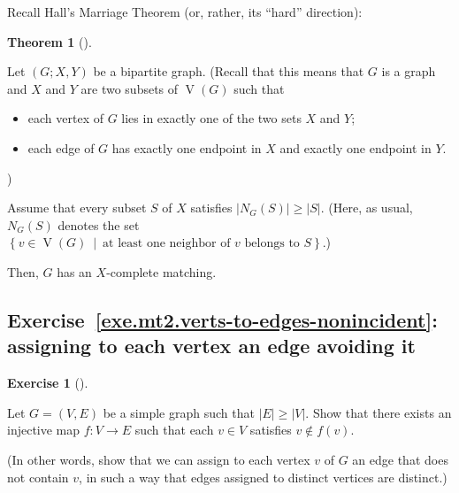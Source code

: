\documentclass[numbers=enddot,12pt,final,onecolumn,notitlepage]{scrartcl}%
\newcounter{exer}
\theoremstyle{definition}
\newtheorem{theo}{Theorem}[section]
\newenvironment{theorem}[1][]
{\begin{theo}[#1]\begin{leftbar}}
{\end{leftbar}\end{theo}}
\newtheorem{exmp}[exer]{Exercise}
\newenvironment{exercise}[1][]
{\begin{exmp}[#1]\begin{leftbar}}
{\end{leftbar}\end{exmp}}
\newcommand{\set}[1]{\left\{ #1 \right\}}
\newcommand{\abs}[1]{\left| #1 \right|}
\newcommand{\tup}[1]{\left( #1 \right)}
\newcommand{\verts}[1]{\operatorname{V}\left( #1 \right)}
\begin{document}
Recall Hall's Marriage Theorem (or, rather, its ``hard'' direction):

\begin{theorem} \label{thm.hall.hard-direction}
Let $\tup{G; X, Y}$ be a bipartite graph.
(Recall that this means that $G$ is a graph and $X$ and $Y$ are two
subsets of $\verts{G}$ such that
\begin{itemize}
\item each vertex of $G$ lies in exactly
one of the two sets $X$ and $Y$;
\item each edge of $G$ has
exactly one endpoint in $X$ and exactly one endpoint in $Y$.
\end{itemize}
)

Assume that every subset $S$ of $X$ satisfies
$\abs{N_G\tup{S}} \geq \abs{S}$.
(Here, as usual, $N_G\tup{S}$ denotes the set
$\set{ v \in \verts{G} \ \mid \ \text{at least one neighbor of } v
                        \text{ belongs to } S }$.)

Then, $G$ has an $X$-complete matching.
\end{theorem}

\subsection{Exercise~\ref{exe.mt2.verts-to-edges-nonincident}:
assigning to each vertex an edge avoiding it}

\begin{exercise} \label{exe.mt2.verts-to-edges-nonincident}
Let $G = \tup{V, E}$ be a simple graph such that
$\abs{E} \geq \abs{V}$.
Show that there exists an injective map $f : V \to E$ such that each
$v \in V$ satisfies $v \notin f\tup{v}$.

(In other words, show that we can assign to each vertex $v$ of $G$
an edge that does not contain $v$, in such a way that edges assigned
to distinct vertices are distinct.)
\end{exercise}
\end{document}
